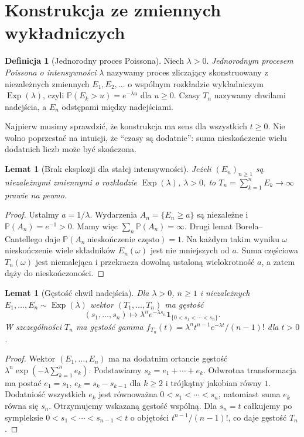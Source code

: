 \documentclass[11pt,a4paper,oneside]{report}
\numberwithin{equation}{chapter}
\theoremstyle{plain}
\newtheorem{lemat}[twierdzenie]{Lemat}
\theoremstyle{definition}
\newtheorem{definicja}{Definicja}[chapter]
\theoremstyle{remark}
\newcommand{\Prob}{\mathbb{P}}
\newcommand{\ind}[1]{\mathbf{1}_{#1}}
\begin{document}
\section{Konstrukcja ze zmiennych wykładniczych}
\begin{definicja}[Jednorodny proces Poissona]
Niech $\lambda>0$. \emph{Jednorodnym procesem Poissona o intensywności
$\lambda$} nazywamy proces zliczający skonstruowany z niezależnych
zmiennych $E_1,E_2,\ldots$ o wspólnym rozkładzie wykładniczym
$\operatorname{Exp}(\lambda)$, czyli
$\Prob(E_k>u)=e^{-\lambda u}$ dla $u\ge0$.
Czasy $T_n$ nazywamy chwilami nadejścia, a $E_n$ odstępami między
nadejściami.
\end{definicja}

Najpierw musimy sprawdzić, że konstrukcja ma sens dla wszystkich
$t\ge0$. Nie wolno poprzestać na intuicji, że ``czasy są dodatnie'':
suma nieskończenie wielu dodatnich liczb może być skończona.

\begin{lemat}[Brak eksplozji dla stałej intensywności]
Jeżeli $(E_n)_{n\ge1}$ są niezależnymi zmiennymi o rozkładzie
$\operatorname{Exp}(\lambda)$, $\lambda>0$, to
$T_n=\sum_{k=1}^n E_k\to\infty$ prawie na pewno.
\end{lemat}
\begin{proof}
Ustalmy $a=1/\lambda$. Wydarzenia $A_n=\{E_n\ge a\}$ są niezależne
i $\Prob(A_n)=e^{-1}>0$. Mamy więc
$\sum_n\Prob(A_n)=\infty$. Drugi lemat Borela--Cantellego daje
$\Prob(A_n\ \text{nieskończenie często})=1$. Na każdym takim
wyniku $\omega$ nieskończenie wiele składników $E_n(\omega)$ jest
nie mniejszych od $a$. Suma częściowa $T_n(\omega)$ jest niemalejąca
i przekracza dowolną ustaloną wielokrotność $a$, a zatem dąży do
nieskończoności.
\end{proof}

\begin{lemat}[Gęstość chwil nadejścia]
Dla $\lambda>0$, $n\ge1$ i niezależnych
$E_1,\ldots,E_n\sim\operatorname{Exp}(\lambda)$ wektor
$(T_1,\ldots,T_n)$ ma gęstość
\[
(s_1,\ldots,s_n)\longmapsto
\lambda^n e^{-\lambda s_n}\ind{\{0<s_1<\cdots<s_n\}}.
\]
W szczególności $T_n$ ma gęstość gamma
$f_{T_n}(t)=\lambda^n t^{n-1}e^{-\lambda t}/(n-1)!$ dla $t>0$.
\end{lemat}
\begin{proof}
Wektor $(E_1,\ldots,E_n)$ ma na dodatnim ortancie gęstość
$\lambda^n\exp(-\lambda\sum_{k=1}^n e_k)$.
Podstawiamy $s_k=e_1+\cdots+e_k$. Odwrotna transformacja ma postać
$e_1=s_1$, $e_k=s_k-s_{k-1}$ dla $k\ge2$ i trójkątny jakobian
równy $1$. Dodatniość wszystkich $e_k$ jest równoważna
$0<s_1<\cdots<s_n$, natomiast suma $e_k$ równa się $s_n$.
Otrzymujemy wskazaną gęstość wspólną. Dla $s_n=t$ całkujemy po
sympleksie $0<s_1<\cdots<s_{n-1}<t$ o objętości
$t^{n-1}/(n-1)!$, co daje gęstość $T_n$.
\end{proof}
\end{document}
